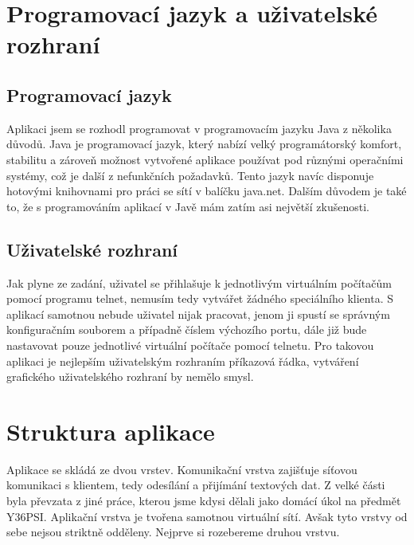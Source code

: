 
\section{Programovací jazyk a uživatelské rozhraní}

\subsection{Programovací jazyk}
Aplikaci jsem se rozhodl programovat v programovacím jazyku Java z několika důvodů. Java je programovací jazyk, který nabízí velký programátorský komfort, stabilitu a zároveň možnost vytvořené aplikace používat pod různými operačními systémy, což je další z nefunkčních požadavků. Tento jazyk navíc disponuje hotovými knihovnami pro práci se sítí v balíčku java.net. Dalším důvodem je také to, že s programováním aplikací v Javě mám zatím asi největší zkušenosti.

\subsection{Uživatelské rozhraní}

Jak plyne ze zadání, uživatel se přihlašuje k jednotlivým virtuálním počítačům pomocí programu telnet, nemusím tedy vytvářet žádného speciálního klienta. S aplikací samotnou nebude uživatel nijak pracovat, jenom ji spustí se správným konfiguračním souborem a případně číslem výchozího portu, dále již bude nastavovat pouze jednotlivé virtuální počítače pomocí telnetu. Pro takovou aplikaci je nejlepším uživatelským rozhraním příkazová řádka, vytváření grafického uživatelského rozhraní by nemělo smysl.


\section{Struktura aplikace}

Aplikace se skládá ze dvou vrstev. Komunikační vrstva zajišťuje síťovou komunikaci s klientem, tedy odesílání a přijímání textových dat. Z velké části byla převzata z jiné práce, kterou jsme kdysi dělali jako domácí úkol na předmět Y36PSI. Aplikační vrstva je tvořena samotnou virtuální sítí. Avšak tyto vrstvy od sebe nejsou striktně odděleny. Nejprve si rozebereme druhou vrstvu.

